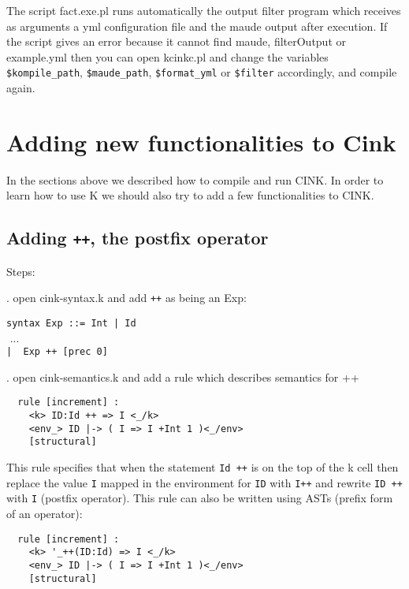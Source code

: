 \documentclass[11pt,a4paper]{article}
\begin{document}
The script fact.exe.pl runs automatically the output filter program which receives as arguments a yml configuration file and the maude output after execution. If the script gives an error because it cannot find maude, filterOutput or example.yml then you can open kcinkc.pl and change the variables \verb^$kompile_path^, \verb^$maude_path^, \verb^$format_yml^ or \verb^$filter^ accordingly, and compile again.

\section{Adding new functionalities to Cink}

In the sections above we described how to compile and run CINK. In order to learn how to use K we should also try to add a few functionalities to CINK.

\subsection{Adding \texttt{++}, the postfix operator}
Steps:

. open cink-syntax.k and add \texttt{++} as being an Exp:

\begin{tabbing}
\hspace{1cm}\verb+syntax Exp ::= Int | Id+
\\ \hspace{3.1cm} $ $ ...
\\ \hspace{3.3cm} \verb^|  Exp ++ [prec 0]^
\end{tabbing}

. open cink-semantics.k and add a rule which describes semantics for ++

\begin{verbatim}
  rule [increment] :
    <k> ID:Id ++ => I <_/k>
    <env_> ID |-> ( I => I +Int 1 )<_/env>
    [structural]
\end{verbatim}

This rule specifies that when the statement \texttt{Id ++}  is on the top of the k cell then replace the value \texttt{I} mapped in the environment for \texttt{ID} with \texttt{I++} and rewrite \texttt{ID ++} with \texttt{I} (postfix operator). This rule can also be written using ASTs (prefix form of an operator):

\begin{verbatim}
  rule [increment] :
    <k> '_++(ID:Id) => I <_/k>
    <env_> ID |-> ( I => I +Int 1 )<_/env>
    [structural]
\end{verbatim}
\end{document}
